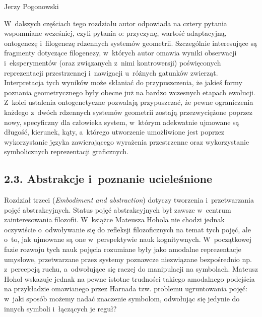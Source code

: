\begin{newrevplenv}{Jerzy Pogonowski}
\begin{enumerate}
\end{enumerate}

W~dalszych częściach tego rozdziału autor odpowiada na cztery
pytania wspomniane wcześniej, czyli pytania o: przyczynę, wartość
adaptacyjną, ontogenezę i~filogenezę rdzennych systemów geometrii.
Szczególnie interesujące są fragmenty dotyczące filogenezy, w~których
autor omawia wyniki obserwacji i~eksperymentów (oraz związanych z~nimi kontrowersji) poświęconych reprezentacji przestrzennej i~nawigacji u~różnych gatunków zwierząt. Interpretacja tych wyników
może skłaniać do przypuszczenia, że jakieś formy poznania
geometrycznego były obecne już na bardzo wczesnych etapach
ewolucji. Z~kolei ustalenia ontogenetyczne pozwalają przypuszczać,
że pewne ograniczenia każdego z~dwóch rdzennych systemów geometrii
zostają przezwyciężone poprzez nowy, specyficzny dla człowieka
system, w~którym adekwatnie ujmowane są długość, kierunek, kąty, a~którego utworzenie umożliwione jest poprzez wykorzystanie języka
zawierającego wyrażenia przestrzenne oraz wykorzystanie
symbolicznych reprezentacji graficznych.

\subsection{2.3. Abstrakcje i~poznanie ucieleśnione}

Rozdział trzeci ({\em Embodiment and abstraction}) dotyczy
tworzenia i~przetwarzania pojęć abstrakcyjnych. Status pojęć
abstrakcyjnych był zawsze w~centrum zainteresowania filozofii. W~książce Mateusza Hohola nie chodzi jednak oczywiście o~odwoływanie
się do refleksji filozoficznych na temat tych pojęć, ale o~to, jak
ujmowane są one w~perspektywie nauk kognitywnych. W~początkowej
fazie rozwoju tych nauk pojęcia rozumiane były jako amodalne
reprezentacje umysłowe, przetwarzane przez systemy poznawcze niezwiązane bezpośrednio np. z~percepcją ruchu, a~odwołujące się
raczej do manipulacji na symbolach. Mateusz Hohol wskazuje jednak
na pewne istotne trudności takiego amodalnego podejścia na
przykładzie omawianego przez Harnada tzw. problemu ugruntowania
pojęć: w~jaki sposób możemy nadać znaczenie symbolom, odwołując
się jedynie do innych symboli i~łączących je reguł? 


\end{newrevplenv}
